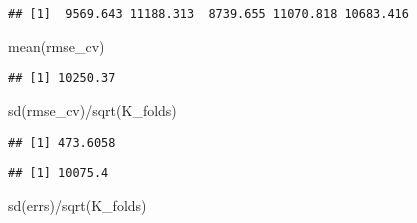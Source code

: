 \documentclass[
]{article}
\newenvironment{Shaded}{\begin{snugshade}}{\end{snugshade}}
\newcommand{\AttributeTok}[1]{\textcolor[rgb]{0.77,0.63,0.00}{#1}}
\newcommand{\ConstantTok}[1]{\textcolor[rgb]{0.00,0.00,0.00}{#1}}
\newcommand{\DecValTok}[1]{\textcolor[rgb]{0.00,0.00,0.81}{#1}}
\newcommand{\FunctionTok}[1]{\textcolor[rgb]{0.00,0.00,0.00}{#1}}
\newcommand{\NormalTok}[1]{#1}
\newcommand{\OtherTok}[1]{\textcolor[rgb]{0.56,0.35,0.01}{#1}}
\newcommand{\SpecialCharTok}[1]{\textcolor[rgb]{0.00,0.00,0.00}{#1}}
\begin{document}
\begin{verbatim}
## [1]  9569.643 11188.313  8739.655 11070.818 10683.416
\end{verbatim}

\begin{Shaded}
\begin{Highlighting}[]
\FunctionTok{mean}\NormalTok{(rmse\_cv)}
\end{Highlighting}
\end{Shaded}

\begin{verbatim}
## [1] 10250.37
\end{verbatim}

\begin{Shaded}
\begin{Highlighting}[]
\FunctionTok{sd}\NormalTok{(rmse\_cv)}\SpecialCharTok{/}\FunctionTok{sqrt}\NormalTok{(K\_folds)}
\end{Highlighting}
\end{Shaded}

\begin{verbatim}
## [1] 473.6058
\end{verbatim}

\begin{Shaded}
\end{Shaded}

\begin{verbatim}
## [1] 10075.4
\end{verbatim}

\begin{Shaded}
\begin{Highlighting}[]
\FunctionTok{sd}\NormalTok{(errs)}\SpecialCharTok{/}\FunctionTok{sqrt}\NormalTok{(K\_folds)}
\end{Highlighting}
\end{Shaded}
\end{document}
